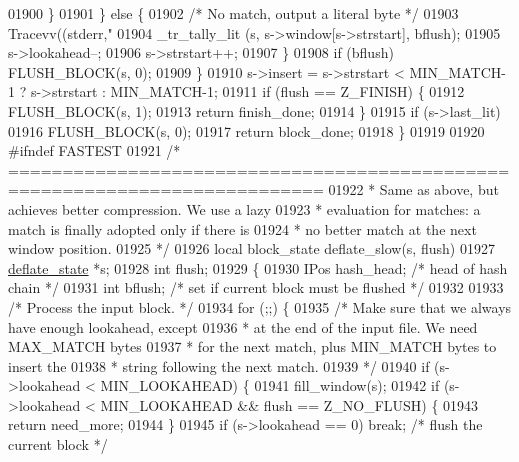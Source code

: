 \begin{DoxyCode}
{{{{{01900             \}
01901         \} \textcolor{keywordflow}{else} \{
01902             \textcolor{comment}{/* No match, output a literal byte */}
01903             Tracevv((stderr,\textcolor{stringliteral}{"%
01904             \_tr\_tally\_lit (s, s->window[s->strstart], bflush);
01905             s->lookahead--;
01906             s->strstart++;
01907         \}
01908         \textcolor{keywordflow}{if} (bflush) FLUSH\_BLOCK(s, 0);
01909     \}
01910     s->insert = s->strstart < MIN\_MATCH-1 ? s->strstart : MIN\_MATCH-1;
01911     \textcolor{keywordflow}{if} (flush == Z\_FINISH) \{
01912         FLUSH\_BLOCK(s, 1);
01913         \textcolor{keywordflow}{return} finish\_done;
01914     \}
01915     \textcolor{keywordflow}{if} (s->last\_lit)
01916         FLUSH\_BLOCK(s, 0);
01917     \textcolor{keywordflow}{return} block\_done;
01918 \}
01919 
01920 \textcolor{preprocessor}{#ifndef FASTEST}
01921 \textcolor{comment}{/* ===========================================================================}
01922 \textcolor{comment}{ * Same as above, but achieves better compression. We use a lazy}
01923 \textcolor{comment}{ * evaluation for matches: a match is finally adopted only if there is}
01924 \textcolor{comment}{ * no better match at the next window position.}
01925 \textcolor{comment}{ */}
01926 local block\_state deflate\_slow(s, flush)
01927     \hyperlink{structinternal__state}{deflate\_state} *s;
01928     \textcolor{keywordtype}{int} flush;
01929 \{
01930     IPos hash\_head;          \textcolor{comment}{/* head of hash chain */}
01931     \textcolor{keywordtype}{int} bflush;              \textcolor{comment}{/* set if current block must be flushed */}
01932 
01933     \textcolor{comment}{/* Process the input block. */}
01934     \textcolor{keywordflow}{for} (;;) \{
01935         \textcolor{comment}{/* Make sure that we always have enough lookahead, except}
01936 \textcolor{comment}{         * at the end of the input file. We need MAX\_MATCH bytes}
01937 \textcolor{comment}{         * for the next match, plus MIN\_MATCH bytes to insert the}
01938 \textcolor{comment}{         * string following the next match.}
01939 \textcolor{comment}{         */}
01940         \textcolor{keywordflow}{if} (s->lookahead < MIN\_LOOKAHEAD) \{
01941             fill\_window(s);
01942             \textcolor{keywordflow}{if} (s->lookahead < MIN\_LOOKAHEAD && flush == Z\_NO\_FLUSH) \{
01943                 \textcolor{keywordflow}{return} need\_more;
01944             \}
01945             \textcolor{keywordflow}{if} (s->lookahead == 0) \textcolor{keywordflow}{break}; \textcolor{comment}{/* flush the current block */}
}}}}}}
\end{DoxyCode}
